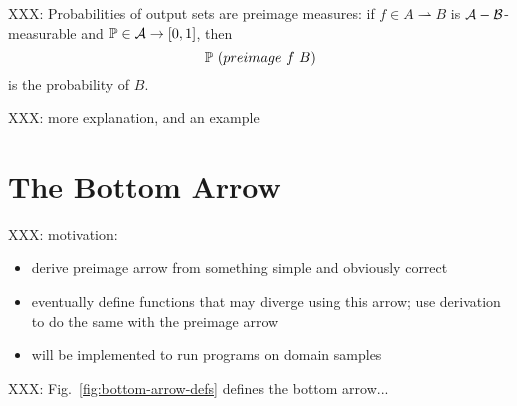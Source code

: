 \documentclass[preprint]{sigplanconf}
\newcommand{\pto}{\rightharpoonup}
\begin{document}
XXX: Probabilities of output sets are preimage measures: if $f \in A \pto B$ is $\A-\B$-measurable and $\P \in \A \to [0,1]$, then
\begin{equation}
	\P~(preimage~f~B)
\end{equation}
is the probability of $B$.

XXX: more explanation, and an example


\section{The Bottom Arrow}

XXX: motivation:
\begin{itemize}
	\item derive preimage arrow from something simple and obviously correct
	\item eventually define functions that may diverge using this arrow; use derivation to do the same with the preimage arrow
	\item will be implemented to run programs on domain samples
\end{itemize}

XXX: Fig.~\ref{fig:bottom-arrow-defs} defines the bottom arrow...
\end{document}
